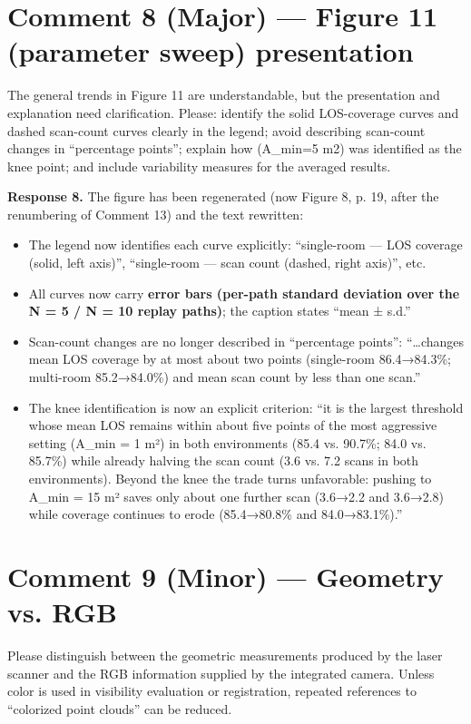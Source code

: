 \section*{Comment 8 (Major) — Figure 11 (parameter sweep) presentation}

\begin{quoting}
The general trends in Figure 11 are understandable, but the presentation and explanation need clarification. Please: identify the solid LOS-coverage curves and dashed scan-count curves clearly in the legend; avoid describing scan-count changes in “percentage points”; explain how (A\_min=5 m2) was identified as the knee point; and include variability measures for the averaged results.
\end{quoting}

\textbf{Response 8.} The figure has been regenerated (now Figure 8, p. 19, after the renumbering of Comment 13) and the text rewritten:
\begin{itemize}
\item The legend now identifies each curve explicitly: “single-room — LOS coverage (solid, left axis)”, “single-room — scan count (dashed, right axis)”, etc.
\item All curves now carry \textbf{error bars (per-path standard deviation over the N = 5 / N = 10 replay paths)}; the caption states “mean ± s.d.”
\item Scan-count changes are no longer described in “percentage points”: “…changes mean LOS coverage by at most about two points (single-room 86.4→84.3\%; multi-room 85.2→84.0\%) and mean scan count by less than one scan.”
\item The knee identification is now an explicit criterion: “it is the largest threshold whose mean LOS remains within about five points of the most aggressive setting (A\_min = 1 m²) in both environments (85.4 vs. 90.7\%; 84.0 vs. 85.7\%) while already halving the scan count (3.6 vs. 7.2 scans in both environments). Beyond the knee the trade turns unfavorable: pushing to A\_min = 15 m² saves only about one further scan (3.6→2.2 and 3.6→2.8) while coverage continues to erode (85.4→80.8\% and 84.0→83.1\%).”
\end{itemize}

\section*{Comment 9 (Minor) — Geometry vs. RGB}

\begin{quoting}
Please distinguish between the geometric measurements produced by the laser scanner and the RGB information supplied by the integrated camera. Unless color is used in visibility evaluation or registration, repeated references to “colorized point clouds” can be reduced.
\end{quoting}


